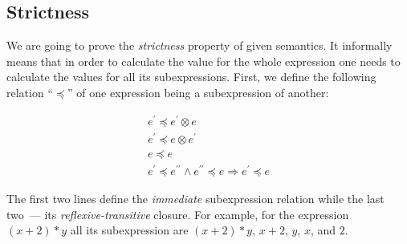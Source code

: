 \subsection{Strictness}

We are going to prove the \emph{strictness} property of given semantics. It informally means that in order to calculate the
value for the whole expression one needs to calculate the values for all its subexpressions. First, we define the
following relation ``$\preceq$'' of one expression being a subexpression of another:

\[
\begin{array}{c}
  e^\prime \preceq e^\prime\otimes e \\
  e^\prime \preceq e\otimes e^\prime \\
  e\preceq e \\
  e^\prime\preceq e^{\prime\prime} \wedge e^{\prime\prime}\preceq e \Rightarrow e^\prime\preceq e
\end{array}
\]

The first two lines define the \emph{immediate} subexpression relation while the last two~--- its \emph{reflexive-transitive}
closure. For example, for the expression $(x+2)*y$ all its subexpression are $(x+2)*y$, $x+2$, $y$, $x$, and $2$.

